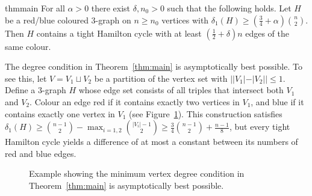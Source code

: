 \documentclass[A4paper,12pt]{article}
\theoremstyle{definition}
\begin{document}
\begin{restatable}{thm}{main}
\label{thm:main}
    For all $\alpha > 0$ there exist $\delta, n_0 > 0$ such that the following holds. Let $H$ be a red/blue coloured 3-graph on $n \geq n_0$ vertices with $\delta_1(H) \geq (\frac{3}{4} + \alpha)\binom{n}{2}$. Then $H$ contains a tight Hamilton cycle with at least $(\frac{1}{2} + \delta)n$ edges of the same colour.
\end{restatable}
The degree condition in Theorem~\ref{thm:main} is asymptotically best possible. To see this, let $V = V_1 \sqcup V_2$ be a partition of the vertex set with 
$||V_1|-|V_2||\leq 1$. 
Define a $3$-graph $H$ whose edge set consists of all triples that intersect both $V_1$ and $V_2$. 
Colour an edge red if it contains exactly two vertices in $V_1$, and blue if it contains exactly one vertex in $V_1$ (see Figure~\ref{fig:extremal}). 
This construction satisfies $\delta_1(H)\geq \binom{n-1}{2} - \max_{i=1,2} \binom{|V_i|-1}{2} \ge  \frac{3}{4}\binom{n-1}{2} +\frac{n-1}{8}$, but every tight Hamilton cycle yields a difference of at most a constant between its numbers of red and blue edges. 
\begin{figure}[h!]
\begin{center}
\end{center}
\caption{Example showing the minimum vertex degree condition in Theorem~\ref{thm:main} is asymptotically best possible.}\label{fig:extremal}
\end{figure}
\end{document}
